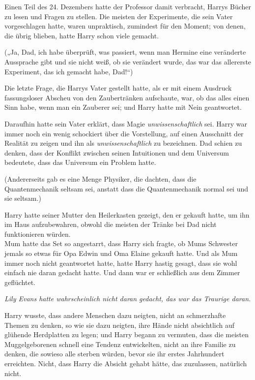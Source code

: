 {Einen Teil des 24. Dezembers hatte der Professor damit verbracht, Harrys Bücher zu lesen und Fragen zu stellen. Die meisten der Experimente, die sein Vater vorgeschlagen hatte, waren unpraktisch, zumindest für den Moment; von denen, die übrig blieben, hatte Harry schon viele gemacht.

(„Ja, Dad, ich habe überprüft, was passiert, wenn man Hermine eine veränderte Aussprache gibt und sie nicht weiß, ob sie verändert wurde, das war das allererste Experiment, das ich gemacht habe, Dad!“)

Die letzte Frage, die Harrys Vater gestellt hatte, als er mit einem Ausdruck fassungsloser Abscheu von den Zaubertränken aufschaute, war, ob das alles einen Sinn habe, wenn man ein Zauberer sei; und Harry hatte mit Nein geantwortet.

Daraufhin hatte sein Vater erklärt, dass Magie \emph{unwissenschaftlich} sei. Harry war immer noch ein wenig schockiert über die Vorstellung, auf einen Ausschnitt der Realität zu zeigen und ihn als \emph{unwissenschaftlich} zu bezeichnen. Dad schien zu denken, dass der Konflikt zwischen seinen Intuitionen und dem Universum bedeutete, dass das Universum ein Problem hatte.

(Andererseits gab es eine Menge Physiker, die dachten, dass die Quantenmechanik seltsam sei, anstatt dass die Quantenmechanik normal sei und sie seltsam.)

Harry hatte seiner Mutter den Heilerkasten gezeigt, den er gekauft hatte, um ihn im Haus aufzubewahren, obwohl die meisten der Tränke bei Dad nicht funktionieren würden.\\ Mum hatte das Set so angestarrt, dass Harry sich fragte, ob Mums Schwester jemals so etwas für Opa Edwin und Oma Elaine gekauft hatte. Und als Mum immer noch nicht geantwortet hatte, hatte Harry hastig gesagt, dass sie wohl einfach nie daran gedacht hatte. Und dann war er schließlich aus dem Zimmer geflüchtet.

\emph{Lily Evans hatte wahrscheinlich nicht daran gedacht, das war das Traurige daran.}

Harry wusste, dass andere Menschen dazu neigten, nicht an schmerzhafte Themen zu denken, so wie sie dazu neigten, ihre Hände nicht absichtlich auf glühende Herdplatten zu legen; und Harry begann zu vermuten, dass die meisten Muggelgeborenen schnell eine Tendenz entwickelten, nicht an ihre Familie zu denken, die sowieso alle sterben würden, bevor sie ihr erstes Jahrhundert erreichten. Nicht, dass Harry die Absicht gehabt hätte, das zuzulassen, natürlich nicht.

}
